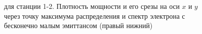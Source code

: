 \begin{figure}[h!]
	\caption{для станции 1-2. Плотность мощности  и его срезы на оси $x$ и $y$ через точку максимума распределения и спектр электрона с бесконечно малым эмиттансом (правый нижний)}
	\label{fig:power_dens_1-2}   
\end{figure}




\normalsize%
